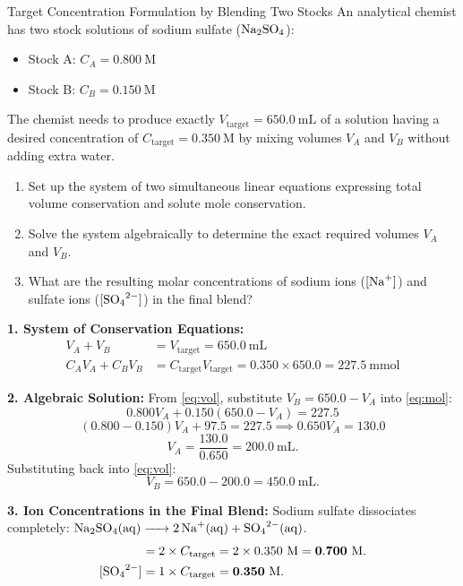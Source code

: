 \begin{exercise}{Target Concentration Formulation by Blending Two Stocks}
An analytical chemist has two stock solutions of sodium sulfate ($\ce{Na2SO4}$):
\begin{itemize}[itemsep=1pt]
  \item Stock A: $C_A = 0.800\ \mathrm{M}$
  \item Stock B: $C_B = 0.150\ \mathrm{M}$
\end{itemize}
The chemist needs to produce exactly $V_{\text{target}} = 650.0\ \mathrm{mL}$ of a solution having a desired concentration of $C_{\text{target}} = 0.350\ \mathrm{M}$ by mixing volumes $V_A$ and $V_B$ without adding extra water.
\begin{enumerate}[leftmargin=1.5em,itemsep=2pt]
  \item Set up the system of two simultaneous linear equations expressing total volume conservation and solute mole conservation.
  \item Solve the system algebraically to determine the exact required volumes $V_A$ and $V_B$.
  \item What are the resulting molar concentrations of sodium ions ($[\ce{Na+}]$) and sulfate ions ($[\ce{SO4^{2-}}]$) in the final blend?
\end{enumerate}
\end{exercise}

\begin{tabletworkspace}[5.0cm]
\end{tabletworkspace}

\begin{solution}
\textbf{1. System of Conservation Equations:}
\begin{align}
V_A + V_B &= V_{\text{target}} = 650.0\ \mathrm{mL} \label{eq:vol} \\
C_A V_A + C_B V_B &= C_{\text{target}} V_{\text{target}} = 0.350 \times 650.0 = 227.5\ \mathrm{mmol} \label{eq:mol}
\end{align}

\textbf{2. Algebraic Solution:}
From \eqref{eq:vol}, substitute $V_B = 650.0 - V_A$ into \eqref{eq:mol}:
\[
0.800 V_A + 0.150(650.0 - V_A) = 227.5
\]
\[
(0.800 - 0.150) V_A + 97.5 = 227.5 \implies 0.650 V_A = 130.0
\]
\[
V_A = \frac{130.0}{0.650} = \mathbf{200.0\ \mathrm{mL}}.
\]
Substituting back into \eqref{eq:vol}:
\[
V_B = 650.0 - 200.0 = \mathbf{450.0\ \mathrm{mL}}.
\]

\textbf{3. Ion Concentrations in the Final Blend:}
Sodium sulfate dissociates completely: $\ce{Na2SO4(aq) -> 2 Na+(aq) + SO4^{2-}(aq)}$.
\begin{align*}
[\ce{Na+}] &= 2 \times C_{\text{target}} = 2 \times 0.350\ \mathrm{M} = \mathbf{0.700\ \mathrm{M}}. \\
[\ce{SO4^{2-}}] &= 1 \times C_{\text{target}} = \mathbf{0.350\ \mathrm{M}}.
\end{align*}
\end{solution}

